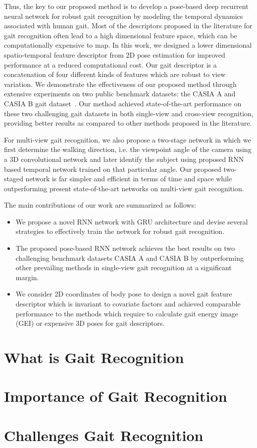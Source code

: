 Thus, the key to our proposed method is to develop a pose-based deep recurrent neural network for robust gait recognition by modeling the temporal dynamics associated with human gait. Most of the descriptors proposed in the literature for gait recognition often lead to a high dimensional feature space, which can be computationally expensive to map. In this work, we designed a lower dimensional spatio-temporal feature descriptor from 2D pose estimation for improved performance at a reduced computational cost. Our gait descriptor is a concatenation of four different kinds of features which are robust to view variation. We demonstrate the effectiveness of our proposed method through extensive experiments on two public benchmark datasets:  the CASIA A and CASIA B gait dataset~\cite{Yu_06}. Our method achieved state-of-the-art performance on these two challenging gait datasets in both single-view and cross-view recognition, providing better results as compared to other methods proposed in the literature.

For multi-view gait recognition, we also propose a two-stage network in which we first determine the walking direction, i.e. the viewpoint angle of the camera using a 3D convolutional network and later identify the subject using proposed RNN based temporal network trained on that particular angle. Our proposed two-staged network is far simpler and efficient in terms of time and space while outperforming present state-of-the-art networks on multi-view gait recognition.


The main contributions of our work are summarized as follows:
\begin{itemize}
\item We propose a novel RNN network with GRU architecture and devise several strategies to effectively train the network for robust gait recognition. 

\item The proposed pose-based RNN network achieves the best results on two challenging benchmark datasets CASIA A and CASIA B by outperforming other prevailing methods in single-view gait recognition at a significant margin.

\item We consider 2D coordinates of body pose to design a novel gait feature descriptor which is invariant to covariate factors and achieved comparable performance to the methods which require to calculate gait energy image (GEI) or expensive 3D poses for gait descriptors.
\end{itemize}


\section{What is Gait Recognition}
\section{Importance of Gait Recognition}
\section{Challenges Gait Recognition}
